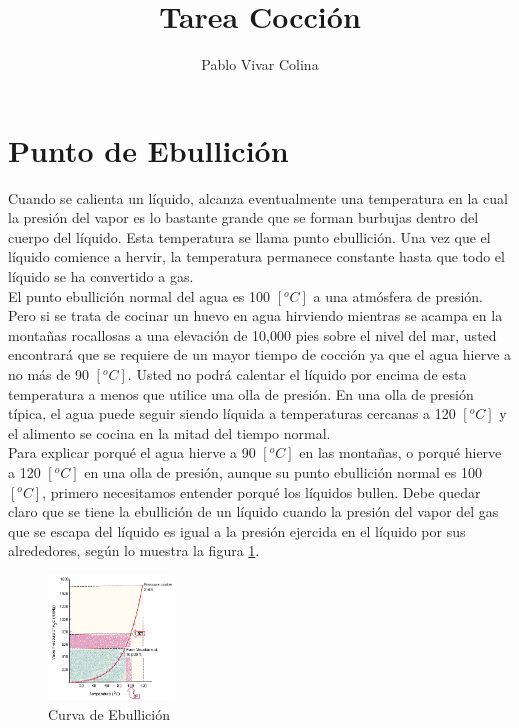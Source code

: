\documentclass[]{article}
\title{Tarea Cocción}
\author{Pablo Vivar Colina}
\begin{document}
	

\maketitle




\section{Punto de Ebullición}

 Cuando se calienta un líquido, alcanza eventualmente una temperatura en la cual la presión del vapor es lo bastante grande que se forman burbujas dentro del cuerpo del líquido. Esta temperatura se llama punto ebullición. Una vez que el líquido comience a hervir, la temperatura permanece constante hasta que todo el líquido se ha convertido a gas.\\

El punto ebullición normal del agua es 100 $[^oC]$ a una atmósfera de presión. Pero si se trata de cocinar un huevo en agua hirviendo mientras se acampa en la montañas rocallosas a una elevación de 10,000 pies sobre el nivel del mar, usted encontrará que se requiere de un mayor tiempo de cocción ya que el agua hierve a no más de 90 $[^oC]$. Usted no podrá calentar el líquido por encima de esta temperatura a menos que utilice una olla de presión. En una olla de presión típica, el agua puede seguir siendo líquida a temperaturas cercanas a 120 $[^oC]$ y el alimento se cocina en la mitad del tiempo normal.\\

Para explicar porqué el agua hierve a 90 $[^oC]$ en las montañas, o porqué hierve a 120 $[^oC]$ en una olla de presión, aunque su punto ebullición normal es 100 $[^oC]$, primero necesitamos entender porqué los líquidos bullen. Debe quedar claro que se tiene la ebullición de un líquido cuando la presión del vapor del gas que se escapa del líquido es igual a la presión ejercida en el líquido por sus alrededores, según lo muestra la figura \ref{curvaEb}.\\

\begin{figure}[h!]
	\centering
	\includegraphics[width=0.3\textwidth]{curvaEb}
    \caption{Curva de Ebullición }
    \label{curvaEb}
\end{figure}
\end{document}
